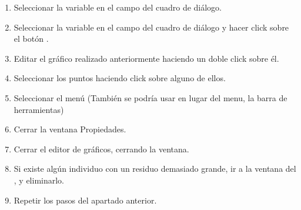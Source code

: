 \begin{enumerate}[leftmargin=*]
\begin{enumerate}
\begin{indicacion}
\begin{enumerate}
\item Seleccionar la variable  en el 
campo  del cuadro de diálogo. 
\item Seleccionar la variable  en el 
campo  del cuadro de diálogo y hacer click sobre el
botón .
\item Editar el gráfico realizado anteriormente haciendo un doble click 
sobre él.
\item Seleccionar los puntos haciendo click sobre alguno de ellos.
\item Seleccionar el menú  
(También se podría usar en lugar del menu, la barra de herramientas)
\item Cerrar la ventana Propiedades.
\item Cerrar el editor de gráficos, cerrando la ventana.
\item Si existe algún individuo con un residuo demasiado grande, 
ir a la ventana del , y eliminarlo.
\item Repetir los pasos del apartado anterior.
\end{enumerate}
\end{indicacion}


\end{enumerate}
\end{enumerate}
